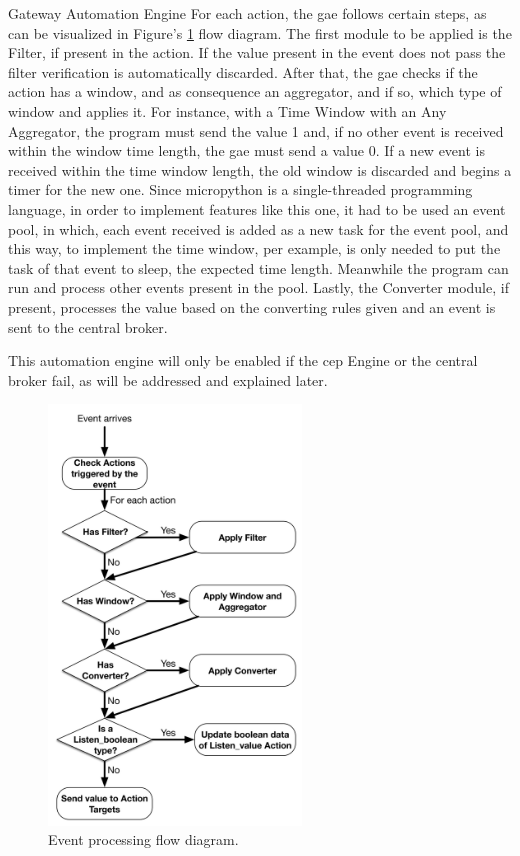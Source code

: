 \begin{Paragraph}{Gateway Automation Engine}
For each action, the \ac{gae} follows certain steps, as can be visualized in Figure's \ref{fig:action} flow diagram. The first module to be applied is the Filter, if present in the action. If the value present in the event does not pass the filter verification is automatically discarded. After that, the \ac{gae} checks if the action has a window, and as consequence an aggregator, and if so, which type of window and applies it. For instance, with a Time Window with an Any Aggregator, the program must send the value 1 and, if no other event is received within the window time length, the \ac{gae} must send a value 0. If a new event is received within the time window length, the old window is discarded and begins a timer for the new one. Since micropython is a single-threaded programming language, in order to implement features like this one, it had to be used an event pool, in which, each event received is added as a new task for the event pool, and this way, to implement the time window, per example, is only needed to put the task of that event to sleep, the expected time length. Meanwhile the program can run and process other events present in the pool. Lastly, the Converter module, if present, processes the value based on the converting rules given and an event is sent to the central broker. 

This automation engine will only be enabled if the \ac{cep} Engine or the central broker fail, as will be addressed and explained later.

\begin{figure}[]
	\centering
	\includegraphics[width=0.6\textwidth]{figures/action.png}
	\caption{Event processing flow diagram.}
	\label{fig:action}
\end{figure}

\end{Paragraph}

